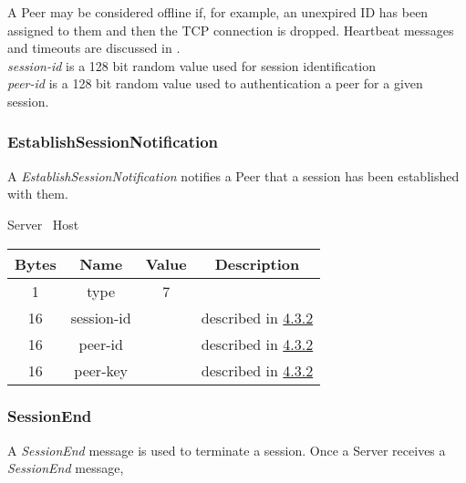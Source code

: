 \documentclass{article}
\begin{document}
    A Peer may be considered offline if, for example, an unexpired ID has been assigned to them and then the TCP
    connection is dropped. Heartbeat messages and timeouts are discussed in %
    .\\

    \emph{session-id} is a 128 bit random value used for session identification\\

    \emph{peer-id} is a 128 bit random value used to authentication a peer for a given session.\\

    \subsubsection{EstablishSessionNotification}

    A \emph{EstablishSessionNotification} notifies a Peer that a session has been established with them.

    \begin{center}
        Server \textrightarrow\ Host\\
        \begin{tabular}{|c|c|c|c|}
            \hline
            \textbf{Bytes} & \textbf{Name} & \textbf{Value} & \textbf{Description}                                \\
            \hline
            1              & type          & 7              &                                                     \\
            \hline
            16             & session-id    &                & described in \hyperlink{subsubsection.4.3.2}{4.3.2} \\
            \hline
            16             & peer-id       &                & described in \hyperlink{subsubsection.4.3.2}{4.3.2} \\
            \hline
            16             & peer-key      &                & described in \hyperlink{subsubsection.4.3.2}{4.3.2} \\
            \hline
        \end{tabular}
    \end{center}

    \subsubsection{SessionEnd}

    A \emph{SessionEnd} message is used to terminate a session. Once a Server receives a \emph{SessionEnd} message,
\end{document}
